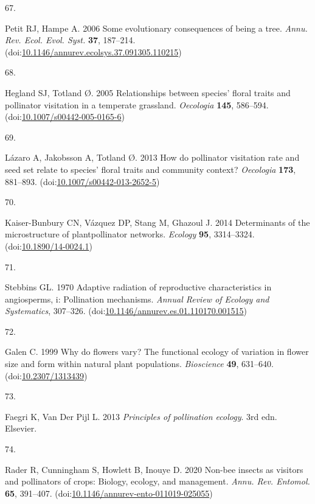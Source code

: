 \documentclass[
  12pt,
  a4paper,
]{article}
\newlength{\cslhangindent}
\newlength{\csllabelwidth}
\newlength{\cslentryspacingunit} %
\newenvironment{CSLReferences}[2] %
 {%
  \setlength{\parindent}{0pt}
  \ifodd #1
  \let\oldpar\par
  \def\par{\hangindent=\cslhangindent\oldpar}
  \fi
  \setlength{\parskip}{#2\cslentryspacingunit}
 }%
 {}
\newcommand{\CSLLeftMargin}[1]{\parbox[t]{\csllabelwidth}{#1}}
\newcommand{\CSLRightInline}[1]{\parbox[t]{\linewidth - \csllabelwidth}{#1}\break}
\begin{document}
\begin{CSLReferences}{0}{0}
\leavevmode{}%
\CSLLeftMargin{67. }
\CSLRightInline{Petit RJ, Hampe A. 2006 Some evolutionary consequences of being a tree. \emph{Annu. Rev. Ecol. Evol. Syst.} \textbf{37}, 187--214. (doi:\href{https://doi.org/10.1146/annurev.ecolsys.37.091305.110215}{10.1146/annurev.ecolsys.37.091305.110215})}

\leavevmode{}%
\CSLLeftMargin{68. }
\CSLRightInline{Hegland SJ, Totland Ø. 2005 Relationships between species' floral traits and pollinator visitation in a temperate grassland. \emph{Oecologia} \textbf{145}, 586--594. (doi:\href{https://doi.org/10.1007/s00442-005-0165-6}{10.1007/s00442-005-0165-6})}

\leavevmode{}%
\CSLLeftMargin{69. }
\CSLRightInline{Lázaro A, Jakobsson A, Totland Ø. 2013 How do pollinator visitation rate and seed set relate to species' floral traits and community context? \emph{Oecologia} \textbf{173}, 881--893. (doi:\href{https://doi.org/10.1007/s00442-013-2652-5}{10.1007/s00442-013-2652-5})}

\leavevmode{}%
\CSLLeftMargin{70. }
\CSLRightInline{Kaiser-Bunbury CN, Vázquez DP, Stang M, Ghazoul J. 2014 Determinants of the microstructure of plant\textendash pollinator networks. \emph{Ecology} \textbf{95}, 3314--3324. (doi:\href{https://doi.org/10.1890/14-0024.1}{10.1890/14-0024.1})}

\leavevmode{}%
\CSLLeftMargin{71. }
\CSLRightInline{Stebbins GL. 1970 Adaptive radiation of reproductive characteristics in angiosperms, i: Pollination mechanisms. \emph{Annual Review of Ecology and Systematics}, 307--326. (doi:\href{https://doi.org/10.1146/annurev.es.01.110170.001515}{10.1146/annurev.es.01.110170.001515})}

\leavevmode{}%
\CSLLeftMargin{72. }
\CSLRightInline{Galen C. 1999 Why do flowers vary? The functional ecology of variation in flower size and form within natural plant populations. \emph{Bioscience} \textbf{49}, 631--640. (doi:\href{https://doi.org/10.2307/1313439}{10.2307/1313439})}

\leavevmode{}%
\CSLLeftMargin{73. }
\CSLRightInline{Faegri K, Van Der Pijl L. 2013 \emph{Principles of pollination ecology}. {3rd edn}. {Elsevier}. }

\leavevmode{}%
\CSLLeftMargin{74. }
\CSLRightInline{Rader R, Cunningham S, Howlett B, Inouye D. 2020 Non-bee insects as visitors and pollinators of crops: Biology, ecology, and management. \emph{Annu. Rev. Entomol.} \textbf{65}, 391--407. (doi:\href{https://doi.org/10.1146/annurev-ento-011019-025055}{10.1146/annurev-ento-011019-025055})}


\end{CSLReferences}
\end{document}

